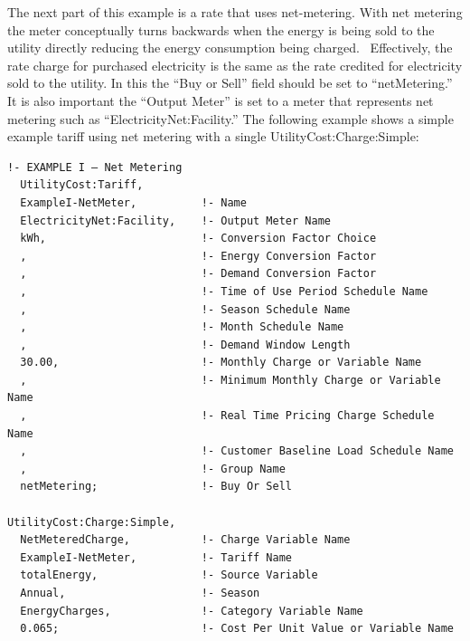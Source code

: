 The next part of this example is a rate that uses net-metering. With net metering the meter conceptually turns backwards when the energy is being sold to the utility directly reducing the energy consumption being charged.~ Effectively, the rate charge for purchased electricity is the same as the rate credited for electricity sold to the utility. In this the ``Buy or Sell'' field should be set to ``netMetering.''~ It is also important the ``Output Meter'' is set to a meter that represents net metering such as ``ElectricityNet:Facility.'' The following example shows a simple example tariff using net metering with a single UtilityCost:Charge:Simple:

\begin{lstlisting}
!- EXAMPLE I – Net Metering
  UtilityCost:Tariff,
  ExampleI-NetMeter,          !- Name
  ElectricityNet:Facility,    !- Output Meter Name
  kWh,                        !- Conversion Factor Choice
  ,                           !- Energy Conversion Factor
  ,                           !- Demand Conversion Factor
  ,                           !- Time of Use Period Schedule Name
  ,                           !- Season Schedule Name
  ,                           !- Month Schedule Name
  ,                           !- Demand Window Length
  30.00,                      !- Monthly Charge or Variable Name
  ,                           !- Minimum Monthly Charge or Variable Name
  ,                           !- Real Time Pricing Charge Schedule Name
  ,                           !- Customer Baseline Load Schedule Name
  ,                           !- Group Name
  netMetering;                !- Buy Or Sell

UtilityCost:Charge:Simple,
  NetMeteredCharge,           !- Charge Variable Name
  ExampleI-NetMeter,          !- Tariff Name
  totalEnergy,                !- Source Variable
  Annual,                     !- Season
  EnergyCharges,              !- Category Variable Name
  0.065;                      !- Cost Per Unit Value or Variable Name
\end{lstlisting}